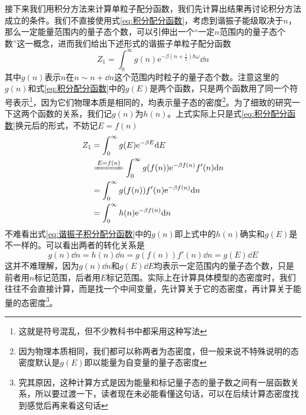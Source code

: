 \documentclass[../../main.tex]{subfiles}
\begin{document}
\begin{example}
\begin{solution}
        接下来我们用积分方法来计算单粒子配分函数，我们先计算出结果再讨论积分方法成立的条件。我们不直接使用式\eqref{eq:积分配分函数}，考虑到谐振子能级取决于\(n\)，那么一定能量范围内的量子态个数，可以引伸出一个“一定\(n\)范围内的量子态个数”这一概念，进而我们给出下述形式的谐振子单粒子配分函数
        \begin{equation}\label{eq:谐振子积分配分函数}
            Z_1=\int_0^{\infty}g(n)\mathrm{e}^{-\beta\left(n+\frac{1}{2}\right)\hbar\omega}\dd n
        \end{equation}
        其中\(g(n)\)表示\(n\)在\(n\sim n+\dd n\)这个范围内时粒子的量子态个数。注意这里的\(g(n)\)和式\eqref{eq:积分配分函数}中的\(g(E)\)是两个函数，只是两个函数用了同一个符号表示\footnote{这就是符号混乱，但不少教科书中都采用这种写法}，因为它们物理本质是相同的，均表示量子态的密度\footnote{因为物理本质相同，我们都可以称两者为态密度，但一般来说不特殊说明的态密度默认是\(g(E)\)即以能量为自变量的量子态密度}。为了细致的研究一下这两个函数的关系，我们记\(g(n)\)为\(h(n)\)。上式实际上只是式\eqref{eq:积分配分函数}换元后的形式，不妨记\(E=f(n)\)
        \begin{equation}
            \begin{split}
                Z_1&=\int_0^{\infty}g(E)\mathrm{e}^{-\beta E}\dd E \\
                &\xlongequal{E=f(n)}\int_0^{\infty}g(f(n))\mathrm{e}^{-\beta f(n)}f'(n)\dd n \\
                &=\int_0^{\infty}g(f(n))f'(n)\mathrm{e}^{-\beta f(n)}\dd n \\
                &=\int_0^{\infty}h(n)\mathrm{e}^{-\beta f(n)}\dd n
            \end{split}
        \end{equation}
        不难看出式\eqref{eq:谐振子积分配分函数}中的\(g(n)\)即上式中的\(h(n)\)确实和\(g(E)\)是不一样的。可以看出两者的转化关系是
        \begin{equation}
            g(n)\dd n=h(n)\dd n=g(f(n))f'(n)\dd n=g(E)\dd E
        \end{equation}
        这并不难理解，因为\(g(n)\dd n\)和\(g(E)\dd E\)均表示一定范围内的量子态个数，只是前者用\(n\)标记范围，后者用\(E\)标记范围。实际上在计算具体模型的态密度时，我们往往不会直接计算，而是找一个中间变量，先计算关于它的态密度，再计算关于能量的态密度\footnote{究其原因，这种计算方式是因为能量和标记量子态的量子数之间有一层函数关系，所以要过渡一下，读者现在未必能看懂这句话，可以在后续计算态密度找到感觉后再来看这句话}。


\end{solution}
\end{example}
\end{document}
